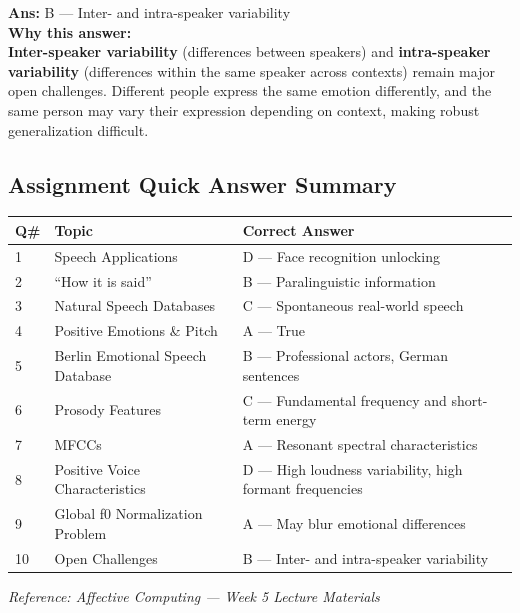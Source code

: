 \documentclass[11pt,a4paper]{article}
\newcommand{\bb}[1]{\textbf{#1}}
\begin{document}
\vspace{0.3cm}
\noindent\textbf{Ans:} B --- Inter- and intra-speaker variability\\[0.2cm]
\textbf{Why this answer:} \\
\textbf{Inter-speaker variability} (differences between speakers) and \textbf{intra-speaker variability} (differences within the same speaker across contexts) remain major open challenges. Different people express the same emotion differently, and the same person may vary their expression depending on context, making robust generalization difficult.
\vspace{0.4cm}

\medskip
\subsection*{Assignment Quick Answer Summary}

\begin{center}
\renewcommand{\arraystretch}{1.4}
\begin{tabular}{|L{0.8cm}|L{6.2cm}|L{8.2cm}|}
\hline
\bb{Q\#} & \bb{Topic} & \bb{Correct Answer} \\
 & Speech Applications & D --- Face recognition unlocking \\
2 & ``How it is said'' & B --- Paralinguistic information \\
3 & Natural Speech Databases & C --- Spontaneous real-world speech \\
4 & Positive Emotions \& Pitch & A --- True \\
5 & Berlin Emotional Speech Database & B --- Professional actors, German sentences \\
6 & Prosody Features & C --- Fundamental frequency and short-term energy \\
7 & MFCCs & A --- Resonant spectral characteristics \\
8 & Positive Voice Characteristics & D --- High loudness variability, high formant frequencies \\
9 & Global f0 Normalization Problem & A --- May blur emotional differences \\
10 & Open Challenges & B --- Inter- and intra-speaker variability \\
\hline
\end{tabular}
\end{center}

\medskip
{\small\textit{Reference: Affective Computing --- Week 5 Lecture Materials}}
\end{document}
